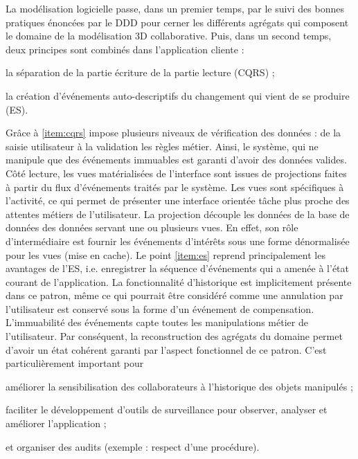 La modélisation logicielle passe, 
dans un premier temps, par le suivi des bonnes pratiques énoncées par le 
\gls{DDD} pour cerner les différents agrégats qui composent le domaine de la 
modélisation 3D collaborative. 
Puis, dans un second temps, deux principes sont combinés dans l'application 
cliente : 
\begin{enumerate*}[label=(\roman*)]
	\item \label{item:cqrs}la séparation de la partie écriture de la partie lecture 
	(\gls{CQRS}) ;
	\item \label{item:es} la création d'événements auto-descriptifs du changement 
	qui vient de se 
	produire (\gls{ES}).
\end{enumerate*}
Grâce à \ref{item:cqrs} impose plusieurs niveaux de vérification des données : de 
la saisie 
utilisateur à la validation les règles métier. Ainsi, le système, qui ne manipule que 
des événements immuables est garanti d'avoir des données valides.
Côté lecture, les vues matérialisées de l'interface sont issues de projections faites 
à partir du flux d'événements traités par le système. Les vues sont spécifiques à 
l'activité, ce qui permet de présenter une interface orientée tâche plus proche des 
attentes métiers de l'utilisateur. La projection découple les données de la base 
de données des données servant une ou plusieurs vues. En effet, son rôle 
d'intermédiaire est fournir les événements d'intérêts sous une forme dénormalisée 
pour les vues (mise en cache).
Le point \ref{item:es} reprend principalement les avantages de l'\gls{ES}, i.e. 
enregistrer la 
séquence d'événements qui a amenée à l'état courant de l'application. La 
fonctionnalité d'historique est implicitement présente dans ce patron, même ce qui 
pourrait être considéré comme une \og annulation\fg{} par l'utilisateur est conservé 
sous la forme d'un événement de compensation. L'immuabilité des événements 
capte toutes les manipulations métier de l'utilisateur. Par conséquent, la 
reconstruction des agrégats du domaine permet d'avoir un état cohérent garanti 
par l'aspect fonctionnel de ce patron. C'est particulièrement important pour 
\begin{enumerate*}[label=(\roman*)]
	\item améliorer la sensibilisation des collaborateurs à l'historique des objets 
	manipulés ;
	\item faciliter le développement d'outils de surveillance pour observer, analyser 
	et améliorer l'application ;
	\item et organiser des audits (exemple : respect d'une procédure).
\end{enumerate*}
%

